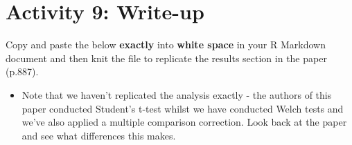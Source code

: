 \documentclass[]{book}
\providecommand{\tightlist}{%
  \setlength{\itemsep}{0pt}\setlength{\parskip}{0pt}}
\begin{document}
\hypertarget{activity-9-write-up}{%
\section{Activity 9: Write-up}\label{activity-9-write-up}}

Copy and paste the below \textbf{exactly} into \textbf{white space} in your R Markdown document and then knit the file to replicate the results section in the paper (p.887).

\begin{itemize}
\tightlist
\item
  Note that we haven't replicated the analysis exactly - the authors of this paper conducted Student's t-test whilst we have conducted Welch tests and we've also applied a multiple comparison correction. Look back at the paper and see what differences this makes.
\end{itemize}
\end{document}
